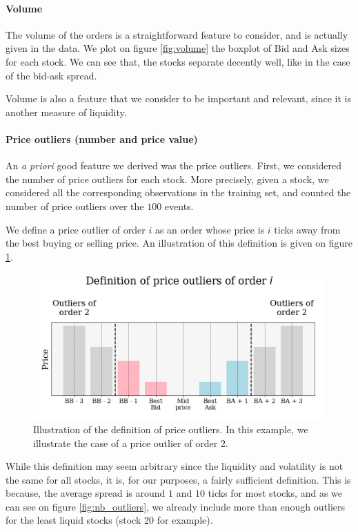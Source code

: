 \documentclass[switch, 11pt]{article}
\begin{document}
\begin{multicols}{2}

    \paragraph{Volume} The volume of the orders is a straightforward feature to consider, and is actually given in the data. We plot on figure \ref{fig:volume} the boxplot of Bid and Ask sizes for each stock. We can see that, the stocks separate decently well, like in the case of the bid-ask spread.

    Volume is also a feature that we consider to be important and relevant, since it is another measure of liquidity.

    \paragraph{Price outliers (number and price value)}
    An \textit{a priori} good feature we derived was the price outliers. First, we considered the number of price outliers for each stock. More precisely, given a stock, we considered all the corresponding observations in the training set, and counted the number of price outliers over the $100$ events.

    We define a price outlier of order $i$ as an order whose price is $i$ ticks away from the best buying or selling price. An illustration of this definition is given on figure \ref{fig:def_outliers}.
    \begin{figure}[H]
        \centering
        \includegraphics[width=\columnwidth]{figures/price_outliers_def.png}
        \caption{Illustration of the definition of price outliers. In this example, we illustrate the case of a price outlier of order $2$.}
        \label{fig:def_outliers}
    \end{figure}
    While this definition may seem arbitrary since the liquidity and volatility is not the same for all stocks, it is, for our purposes, a fairly sufficient definition. This is because, the average spread is around $1$ and $10$ ticks for most stocks, and as we can see on figure \ref{fig:nb_outliers}, we already include more than enough outliers for the least liquid stocks (stock 20 for example).


\end{multicols}
\end{document}
